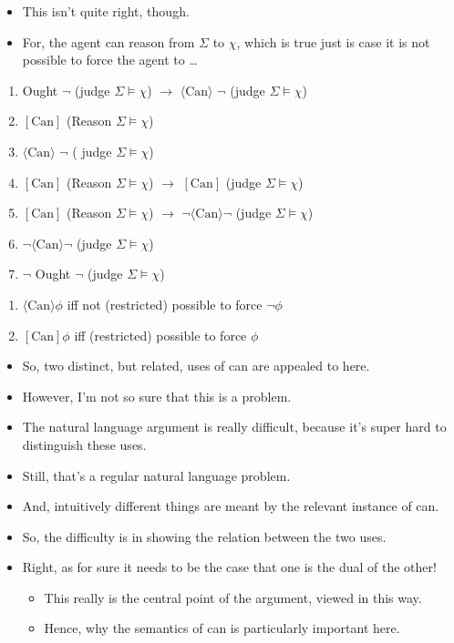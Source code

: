 \documentclass[10pt]{article}
\begin{document}
\begin{itemize}
\item This isn't quite right, though.
\item For, the agent can reason from \(\Sigma\) to \(\chi\), which is true just is case it is not possible to force the agent to \dots
\end{itemize}


\begin{enumerate}
\item Ought \(\lnot\) (judge \(\Sigma \vDash \chi\)) \(\rightarrow\) \(\langle \text{Can} \rangle\) \(\lnot\) (judge \(\Sigma \vDash \chi\))
\item \([\text{Can}]\) (Reason \(\Sigma \vDash \chi\))
\item \(\langle \text{Can} \rangle\) \(\lnot\) ( judge \(\Sigma \vDash \chi\))
\item \([\text{Can}]\) (Reason \(\Sigma \vDash \chi\)) \(\rightarrow\) \([\text{Can}]\) (judge \(\Sigma \vDash \chi\))
\item \([\text{Can}]\) (Reason \(\Sigma \vDash \chi\)) \(\rightarrow\) \(\lnot\langle \text{Can} \rangle\lnot\) (judge \(\Sigma \vDash \chi\))
\item \(\lnot\langle \text{Can} \rangle\lnot\) (judge \(\Sigma \vDash \chi\))
\item \(\lnot\) Ought \(\lnot\) (judge \(\Sigma \vDash \chi\))
\end{enumerate}

\begin{enumerate}
\item \(\langle \text{Can} \rangle \phi\) iff not (restricted) possible to force \(\lnot\phi\)
\item \([\text{Can}] \phi\) iff (restricted) possible to force \(\phi\)
\end{enumerate}

\begin{itemize}
\item So, two distinct, but related, uses of can are appealed to here.
\item However, I'm not so sure that this is a problem.
\item The natural language argument is really difficult, because it's super hard to distinguish these uses.
\item Still, that's a regular natural language problem.
\item And, intuitively different things are meant by the relevant instance of can.
\item So, the difficulty is in showing the relation between the two uses.
\item Right, as for sure it needs to be the case that one is the dual of the other!
  \begin{itemize}
  \item This really is the central point of the argument, viewed in this way.
  \item Hence, why the semantics of can is particularly important here.
  \end{itemize}
\end{itemize}
\end{document}
